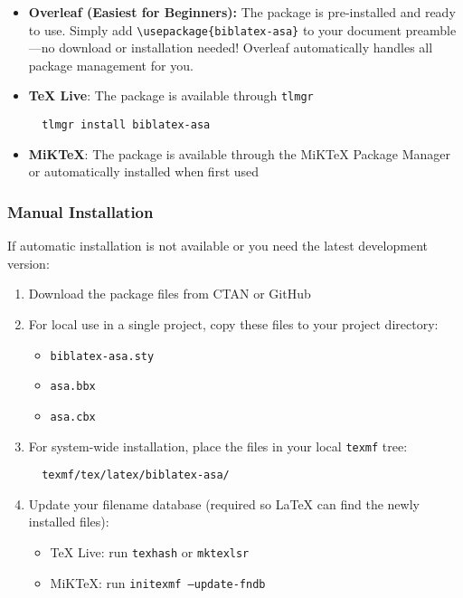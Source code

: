 \documentclass[11pt,a4paper]{ltxdoc}
\begin{document}
\begin{itemize}
  \item \textbf{Overleaf (Easiest for Beginners):} The package is pre-installed and ready to use. Simply add \texttt{\textbackslash usepackage\{biblatex-asa\}} to your document preamble—no download or installation needed! Overleaf automatically handles all package management for you.

  \item \textbf{TeX Live}: The package is available through \texttt{tlmgr}
  \begin{verbatim}
  tlmgr install biblatex-asa
  \end{verbatim}
  
  \item \textbf{MiKTeX}: The package is available through the MiKTeX Package Manager or automatically installed when first used
\end{itemize}

\subsubsection{Manual Installation}

If automatic installation is not available or you need the latest development version:

\begin{enumerate}
  \item Download the package files from CTAN or GitHub
  \item For local use in a single project, copy these files to your project directory:
  \begin{itemize}
    \item \texttt{biblatex-asa.sty}
    \item \texttt{asa.bbx}
    \item \texttt{asa.cbx}
  \end{itemize}
  \item For system-wide installation, place the files in your local \texttt{texmf} tree:
  \begin{verbatim}
  texmf/tex/latex/biblatex-asa/
  \end{verbatim}
  \item Update your filename database (required so LaTeX can find the newly installed files):
  \begin{itemize}
    \item TeX Live: run \texttt{texhash} or \texttt{mktexlsr}
    \item MiKTeX: run \texttt{initexmf --update-fndb}
  \end{itemize}
\end{enumerate}
\end{document}
